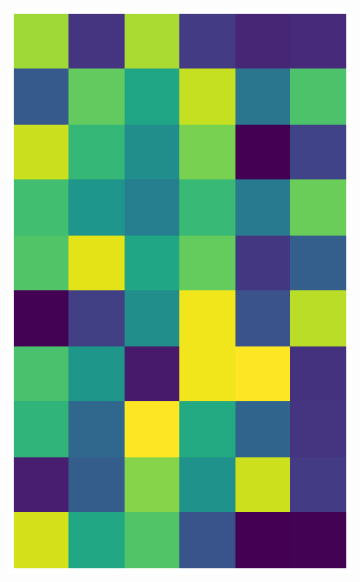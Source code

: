 \documentclass[10pt,twocolumn]{article}
\begin{document}
\begin{figure}[H]
\begin{subfigure}[t]{.15\textwidth}
\centering
\includegraphics[scale=.2]{DWGs/random-matrix-original.eps}
\caption{ }
\end{subfigure}
\begin{subfigure}[t]{.15\textwidth}
\centering

\end{subfigure}
\end{figure}
\end{document}
